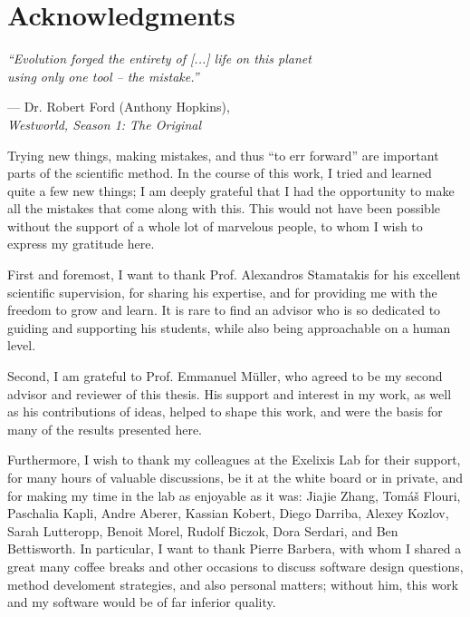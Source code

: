 \section*{Acknowledgments}
\vspace*{1em}

\epigraph
{\textit{``Evolution forged the entirety of [...] life on this planet \\ using only one tool -- the mistake.''}}
{--- Dr. Robert Ford (Anthony Hopkins),\\ \textit{Westworld, Season 1: The Original}}

Trying new things, making mistakes, and thus ``to err forward'' are important parts of the scientific method.
In the course of this work, I tried and learned quite a few new things;
I am deeply grateful that I had the opportunity to make all the mistakes that come along with this.
This would not have been possible without the support of a whole lot of marvelous people,
to whom I wish to express my gratitude here.

First and foremost, I want to thank Prof. Alexandros Stamatakis for his excellent scientific supervision,
for sharing his expertise, and for providing me with the freedom to grow and learn.
It is rare to find an advisor who is so dedicated to guiding and supporting his students,
while also being approachable on a human level.

Second, I am grateful to Prof. Emmanuel M\"uller, who agreed to be my second advisor and reviewer of this thesis.
His support and interest in my work, as well as his contributions of ideas, helped to shape this work,
and were the basis for many of the results presented here.

Furthermore, I wish to thank my colleagues at the Exelixis Lab for their support, for many hours of valuable discussions,
be it at the white board or in private, and for making my time in the lab as enjoyable as it was:
Jiajie Zhang, Tom{\'{a}}{\v{s}} Flouri, Paschalia Kapli, Andre Aberer, Kassian Kobert, Diego Darriba, Alexey Kozlov,
Sarah Lutteropp, Benoit Morel, Rudolf Biczok, Dora Serdari, and Ben Bettisworth.
In particular, I want to thank Pierre Barbera, with whom I shared a great many coffee breaks and other occasions
to discuss software design questions, method develoment strategies, and also personal matters;
without him, this work and my software would be of far inferior quality.

